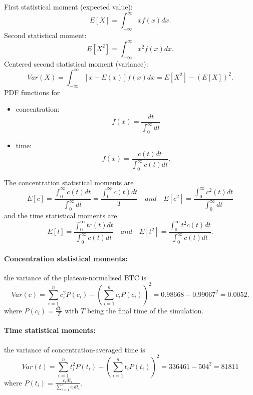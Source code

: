 \documentclass{article}
\begin{document}
\FloatBarrier  %
First statistical moment (expected value):
\begin{equation}
    E\left[X\right] = \int_{-\infty}^{\infty} x f(x) dx.
\end{equation}
Second statistical moment:
\begin{equation}
    E\left[X^2\right] = \int_{-\infty}^{\infty} x^2 f(x) dx.
\end{equation}
Centered second statistical moment (variance):
\begin{equation}
    Var(X) = \int_{-\infty}^{\infty} [x-E(x)] f(x) dx = E[X^2]-(E[X])^2.
\end{equation}
PDF functions for
\begin{itemize}
    \item concentration: \[ f(x) = \frac{dt}{\int_0^{\infty} dt} \]
    \item time: \[ f(x) = \frac{c(t) dt}{\int_0^{\infty} c(t) dt}. \]
\end{itemize}
The concentration statistical moments are
\begin{equation}
    E \left[ c \right] = \frac{\int_0^{\infty} c(t) dt}{\int_0^{\infty} dt} = \frac{\int_0^{\infty} c(t) dt}{T} \quad and \quad E[c^2] = \frac{\int_0^{\infty} c^2(t) dt}{\int_0^{\infty} dt}
\end{equation}
and the time statistical moments are
\begin{equation}
    E \left[ t \right] = \frac{\int_0^{\infty} t c(t) dt}{\int_0^{\infty} c(t) dt} \quad and \quad E[t^2] = \frac{\int_0^{\infty} t^2 c(t) dt}{\int_0^{\infty} c(t) dt}.
    \label{eq:MRT}
\end{equation}
\paragraph{Concentration statistical moments:} the variance of the plateau-normalised BTC is
\begin{equation}
    Var(c) = \sum_{i=1}^{n}c_i^2 P(c_i)-\left(\sum_{i=1}^{n}c_i P(c_i)\right)^2 = 0.98668 - 0.99067^2 = 0.0052.
\end{equation}
where $P(c_i)=\frac{dt_i}{T}$ with $T$ being the final time of the simulation.
\paragraph{Time statistical moments:} the variance of concentration-averaged time is
\begin{equation}
    Var(t) = \sum_{i=1}^{n}t_i^2 P(t_i)-\left(\sum_{i=1}^{n}t_i P(t_i)\right)^2 = 336461-504^2 = 81811
\end{equation}
where $P(t_i)=\frac{c_i dt_i}{\sum_{i=1}^nc_idt_i}$.
\end{document}
